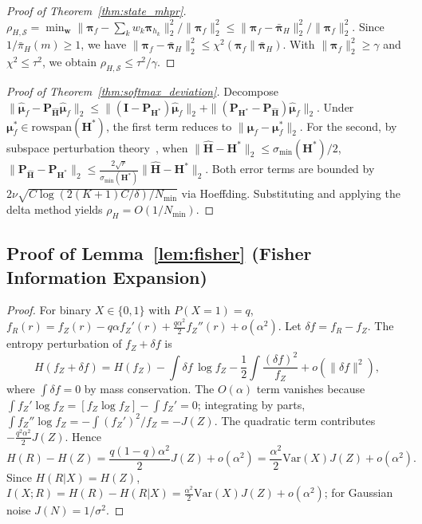 \documentclass[smallextended]{svjour3}       %
\begin{document}
\begin{proof}[Proof of Theorem~\ref{thm:state_mhpr}]
$\rho_{H,\mathcal{S}} = \min_{\mathbf{w}} \|\boldsymbol{\pi}_f - \sum_k w_k\boldsymbol{\pi}_{h_k}\|_2^2 / \|\boldsymbol{\pi}_f\|_2^2 \le \|\boldsymbol{\pi}_f - \bar{\boldsymbol{\pi}}_H\|_2^2 / \|\boldsymbol{\pi}_f\|_2^2$. Since $1/\bar{\pi}_H(m) \ge 1$, we have $\|\boldsymbol{\pi}_f - \bar{\boldsymbol{\pi}}_H\|_2^2 \le \chi^2(\boldsymbol{\pi}_f\|\bar{\boldsymbol{\pi}}_H)$. With $\|\boldsymbol{\pi}_f\|_2^2 \ge \gamma$ and $\chi^2 \le \tau^2$, we obtain $\rho_{H,\mathcal{S}} \le \tau^2/\gamma$.
\end{proof}

\begin{proof}[Proof of Theorem~\ref{thm:softmax_deviation}]
Decompose $\|\hat{\boldsymbol{\mu}}_f - \mathbf{P}_{\hat{\mathbf{H}}}\hat{\boldsymbol{\mu}}_f\|_2 \le \|(\mathbf{I} - \mathbf{P}_{\mathbf{H}^*})\hat{\boldsymbol{\mu}}_f\|_2 + \|(\mathbf{P}_{\mathbf{H}^*} - \mathbf{P}_{\hat{\mathbf{H}}})\hat{\boldsymbol{\mu}}_f\|_2$. Under $\boldsymbol{\mu}_f^* \in \mathrm{rowspan}(\mathbf{H}^*)$, the first term reduces to $\|\hat{\boldsymbol{\mu}}_f - \boldsymbol{\mu}_f^*\|_2$. For the second, by subspace perturbation theory~\cite{stewart1990matrix}, when $\|\hat{\mathbf{H}}-\mathbf{H}^*\|_2 \le \sigma_{\min}(\mathbf{H}^*)/2$, $\|\mathbf{P}_{\hat{\mathbf{H}}} - \mathbf{P}_{\mathbf{H}^*}\|_2 \le \frac{2\sqrt{r}}{\sigma_{\min}(\mathbf{H}^*)}\|\hat{\mathbf{H}}-\mathbf{H}^*\|_2$. Both error terms are bounded by $2\nu\sqrt{C\log(2(K+1)C/\delta)/N_{\min}}$ via Hoeffding. Substituting and applying the delta method yields $\rho_H = O(1/N_{\min})$.
\end{proof}

\subsection{Proof of Lemma~\ref{lem:fisher} (Fisher Information Expansion)}
\label{app:fisher}
\begin{proof}
For binary $X\in\{0,1\}$ with $P(X{=}1)=q$, $f_R(r)=f_Z(r)-q\alpha f_Z'(r)+\frac{q\alpha^2}{2}f_Z''(r)+o(\alpha^2)$. Let $\delta f=f_R-f_Z$. The entropy perturbation of $f_Z+\delta f$ is
\begin{equation}
H(f_Z+\delta f)=H(f_Z)-\int\delta f\,\log f_Z-\frac12\int\frac{(\delta f)^2}{f_Z}+o(\|\delta f\|^2),
\end{equation}
where $\int\delta f=0$ by mass conservation. The $O(\alpha)$ term vanishes because $\int f_Z'\log f_Z=[f_Z\log f_Z]-\int f_Z'=0$; integrating by parts, $\int f_Z''\log f_Z=-\int(f_Z')^2/f_Z=-J(Z)$. The quadratic term contributes $-\frac{q^2\alpha^2}{2}J(Z)$. Hence
\begin{equation}
H(R)-H(Z)=\frac{q(1-q)\alpha^2}{2}J(Z)+o(\alpha^2)=\frac{\alpha^2}{2}\mathrm{Var}(X)J(Z)+o(\alpha^2).
\end{equation}
Since $H(R|X)=H(Z)$, $I(X;R)=H(R)-H(R|X)=\frac{\alpha^2}{2}\mathrm{Var}(X)J(Z)+o(\alpha^2)$; for Gaussian noise $J(N)=1/\sigma^2$.
\end{proof}
\end{document}
